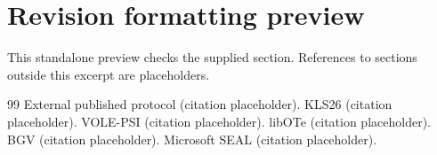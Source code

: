 \documentclass[10pt,twocolumn]{article}
\begin{document}
\section*{Revision formatting preview}
This standalone preview checks the supplied section. References to sections
outside this excerpt are placeholders.
\setcounter{section}{6}
\setcounter{subsection}{1}
\label{sec:integer-ip}

\begin{thebibliography}{99}
 External published protocol (citation placeholder).
 KLS26 (citation placeholder).
 VOLE-PSI (citation placeholder).
 libOTe (citation placeholder).
 BGV (citation placeholder).
 Microsoft SEAL (citation placeholder).
\end{thebibliography}
\end{document}
